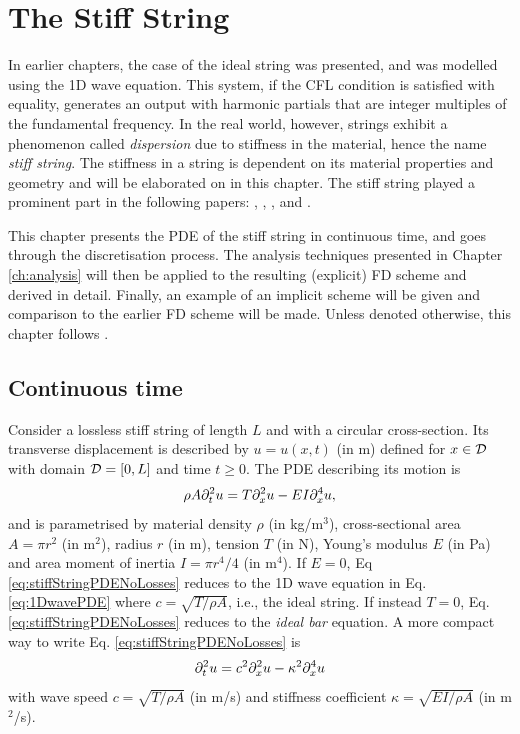 \chapter{The Stiff String}\label{ch:stiffString}
In earlier chapters, the case of the ideal string was presented, and was modelled using the 1D wave equation. This system, if the CFL condition is satisfied with equality, generates an output with harmonic partials that are integer multiples of the fundamental frequency. In the real world, however, strings exhibit a phenomenon called \textit{dispersion} due to stiffness in the material, hence the name \textit{stiff string}. 
The stiffness in a string is dependent on its material properties and geometry and will be elaborated on in this chapter. The stiff string played a prominent part in the following papers: \citeP[A], \citeP[B], \citeP[C], \citeP[D] and \citeP[E].

This chapter presents the PDE of the stiff string in continuous time, and goes through the discretisation process. The analysis techniques presented in Chapter \ref{ch:analysis} will then be applied to the resulting (explicit) FD scheme and derived in detail. Finally, an example of an implicit scheme will be given and comparison to the earlier FD scheme will be made. Unless denoted otherwise, this chapter follows \cite{theBible}.

\section{Continuous time}
Consider a lossless stiff string of length $L$ and with a circular cross-section. Its transverse displacement is described by $u=u(x,t)$ (in m) defined for $x\in \mathcal{D}$ with domain $\mathcal{D} = [0, L]$ and time $t\geq 0$. The PDE describing its motion is 
\begin{equation}\label{eq:stiffStringPDENoLosses}
    \rho A \partial_t^2 u = T \partial_x^2 u - EI \partial_x^4 u,
\end{equation}
and is parametrised by material density $\rho$ (in kg/m$^3$), cross-sectional area $A = \pi r^2$ (in m$^2$), radius $r$ (in m), tension $T$ (in N), Young's modulus $E$ (in Pa) and area moment of inertia $I = \pi r^4/4$ (in m$^4$). If $E = 0$, Eq \eqref{eq:stiffStringPDENoLosses} reduces to the 1D wave equation in Eq. \eqref{eq:1DwavePDE} where $c = \sqrt{T/\rho A}$, i.e., the ideal string. If instead $T = 0$, Eq. \eqref{eq:stiffStringPDENoLosses} reduces to the \textit{ideal bar} equation. A more compact way to write Eq. \eqref{eq:stiffStringPDENoLosses} is 
\begin{equation}
    \partial_t^2 u = c^2 \partial_x^2 u - \kappa^2 \partial_x^4 u
\end{equation}
with wave speed $c = \sqrt{T/\rho A}$ (in m/s) and stiffness coefficient $\kappa = \sqrt{EI / \rho A}$ (in m$^2$/s). 

